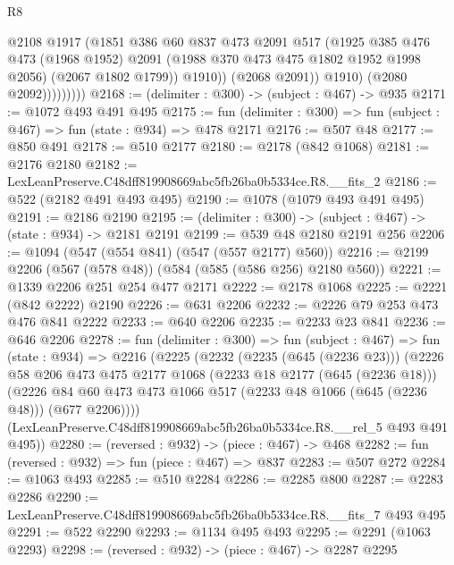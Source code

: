\begin{lexlean}{R8}
\begin{coremodule}
                          @2108
                          @1917
                          (@1851
                            @386
                            @60
                            @837
                            @473
                            @2091
                            @517
                            (@1925
                              @385
                              @476
                              @473
                              (@1968 @1952)
                              @2091
                              (@1988 @370 @473 @475 @1802 @1952 @1998 @2056)
                              (@2067 @1802 @1799))
                            @1910))
                        (@2068 @2091))
                      @1910)
                    (@2080 @2092)))))))))
@2168 := (delimiter : @300) -> (subject : @467) -> @935
@2171 := @1072 @493 @491 @495
@2175 := fun (delimiter : @300) => fun (subject : @467) => fun (state : @934) => @478 @2171
@2176 := @507 @48
@2177 := @850 @491
@2178 := @510 @2177
@2180 := @2178 (@842 @1068)
@2181 := @2176 @2180
@2182 := LexLeanPreserve.C48dff819908669abc5fb26ba0b5334ce.R8.__fits_2
@2186 := @522 (@2182 @491 @493 @495)
@2190 := @1078 (@1079 @493 @491 @495)
@2191 := @2186 @2190
@2195 := (delimiter : @300) -> (subject : @467) -> (state : @934) -> @2181 @2191
@2199 := @539 @48 @2180 @2191 @256
@2206 := @1094 (@547 (@554 @841) (@547 (@557 @2177) @560))
@2216 := @2199 @2206 (@567 (@578 @48)) (@584 (@585 (@586 @256) @2180 @560))
@2221 := @1339 @2206 @251 @254 @477 @2171
@2222 := @2178 @1068
@2225 := @2221 (@842 @2222) @2190
@2226 := @631 @2206
@2232 := @2226 @79 @253 @473 @476 @841 @2222
@2233 := @640 @2206
@2235 := @2233 @23 @841
@2236 := @646 @2206
@2278 := fun (delimiter : @300) =>
  fun (subject : @467) =>
  fun (state : @934) =>
  @2216
    (@2225
      (@2232
        (@2235 (@645 (@2236 @23)))
        (@2226
          @58
          @206
          @473
          @475
          @2177
          @1068
          (@2233 @18 @2177 (@645 (@2236 @18)))
          (@2226 @84 @60 @473 @473 @1066 @517 (@2233 @48 @1066 (@645 (@2236 @48))) (@677 @2206))))
      (LexLeanPreserve.C48dff819908669abc5fb26ba0b5334ce.R8.__rel_5 @493 @491 @495))
@2280 := (reversed : @932) -> (piece : @467) -> @468
@2282 := fun (reversed : @932) => fun (piece : @467) => @837
@2283 := @507 @272
@2284 := @1063 @493
@2285 := @510 @2284
@2286 := @2285 @800
@2287 := @2283 @2286
@2290 := LexLeanPreserve.C48dff819908669abc5fb26ba0b5334ce.R8.__fits_7 @493 @495
@2291 := @522 @2290
@2293 := @1134 @495 @493
@2295 := @2291 (@1063 @2293)
@2298 := (reversed : @932) -> (piece : @467) -> @2287 @2295

\end{coremodule}
\end{lexlean}
